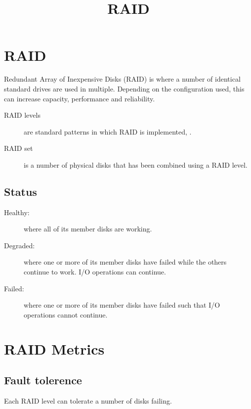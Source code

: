 \documentclass[slides]{pgnotes}
\title{RAID}
\begin{document}
\maketitle

\section{RAID}
\label{sec:raid}

Redundant Array of Inexpensive Disks (RAID) is where a number of
identical standard drives are used in multiple. Depending on the
configuration used, this can increase capacity, performance and
reliability.

\begin{description}
\item[RAID levels]
  are standard patterns in which RAID is implemented, .
\item[RAID set]
  is a number of physical disks that has been combined using a RAID level.
\end{description}
  

\subsection{Status}

\begin{description}
\item[Healthy:]
  where all of its member disks are working.
\item[Degraded:]
  where one or more of its member disks have failed while the others
  continue to work. I/O operations can continue.
\item[Failed:]
  where one or more of its member disks have failed such that I/O
  operations cannot continue.
\end{description}



\section{RAID Metrics}
\label{sec:raid-metrics}

\subsection{Fault tolerence}
\label{sec:fault-tolerence}

Each RAID level can tolerate a number of disks failing.
\end{document}
